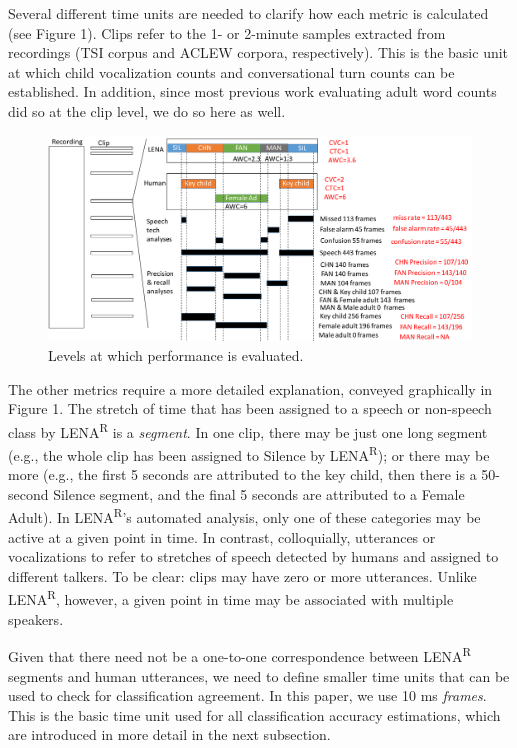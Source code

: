 \documentclass[english,table,man,floatsintext]{apa6}
\begin{document}
Several different time units are needed to clarify how each metric is calculated (see Figure 1). Clips refer to the 1- or 2-minute samples extracted from recordings (TSI corpus and ACLEW corpora, respectively). This is the basic unit at which child vocalization counts and conversational turn counts can be established. In addition, since most previous work evaluating adult word counts did so at the clip level, we do so here as well.

\begin{figure}
\centering
\includegraphics{fig_levels.pdf}
\caption{Levels at which performance is evaluated.}
\end{figure}

The other metrics require a more detailed explanation, conveyed graphically in Figure 1. The stretch of time that has been assigned to a speech or non-speech class by LENA\textsuperscript{R} is a \emph{segment}. In one clip, there may be just one long segment (e.g., the whole clip has been assigned to Silence by LENA\textsuperscript{R}); or there may be more (e.g., the first 5 seconds are attributed to the key child, then there is a 50-second Silence segment, and the final 5 seconds are attributed to a Female Adult). In LENA\textsuperscript{R}'s automated analysis, only one of these categories may be active at a given point in time. In contrast, colloquially, utterances or vocalizations to refer to stretches of speech detected by humans and assigned to different talkers. To be clear: clips may have zero or more utterances. Unlike LENA\textsuperscript{R}, however, a given point in time may be associated with multiple speakers.

Given that there need not be a one-to-one correspondence between LENA\textsuperscript{R} segments and human utterances, we need to define smaller time units that can be used to check for classification agreement. In this paper, we use 10 ms \emph{frames}. This is the basic time unit used for all classification accuracy estimations, which are introduced in more detail in the next subsection.
\end{document}
